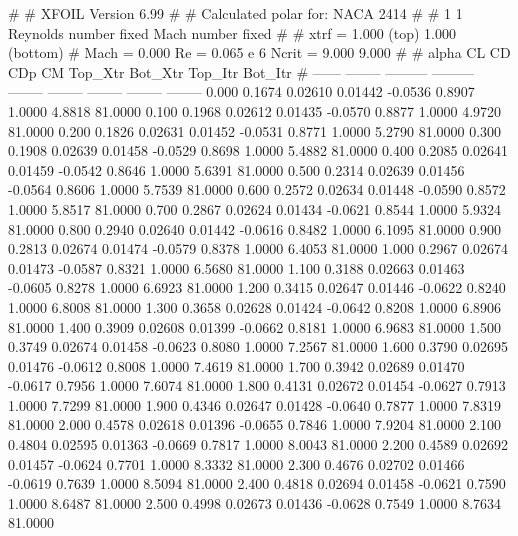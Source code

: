 #  
#       XFOIL         Version 6.99
#  
# Calculated polar for: NACA 2414                                       
#  
# 1 1 Reynolds number fixed          Mach number fixed         
#  
# xtrf =   1.000 (top)        1.000 (bottom)  
# Mach =   0.000     Re =     0.065 e 6     Ncrit =   9.000  9.000
#  
#   alpha    CL        CD       CDp       CM     Top_Xtr  Bot_Xtr  Top_Itr  Bot_Itr
#  ------ -------- --------- --------- -------- -------- -------- -------- --------
   0.000   0.1674   0.02610   0.01442  -0.0536   0.8907   1.0000   4.8818  81.0000
   0.100   0.1968   0.02612   0.01435  -0.0570   0.8877   1.0000   4.9720  81.0000
   0.200   0.1826   0.02631   0.01452  -0.0531   0.8771   1.0000   5.2790  81.0000
   0.300   0.1908   0.02639   0.01458  -0.0529   0.8698   1.0000   5.4882  81.0000
   0.400   0.2085   0.02641   0.01459  -0.0542   0.8646   1.0000   5.6391  81.0000
   0.500   0.2314   0.02639   0.01456  -0.0564   0.8606   1.0000   5.7539  81.0000
   0.600   0.2572   0.02634   0.01448  -0.0590   0.8572   1.0000   5.8517  81.0000
   0.700   0.2867   0.02624   0.01434  -0.0621   0.8544   1.0000   5.9324  81.0000
   0.800   0.2940   0.02640   0.01442  -0.0616   0.8482   1.0000   6.1095  81.0000
   0.900   0.2813   0.02674   0.01474  -0.0579   0.8378   1.0000   6.4053  81.0000
   1.000   0.2967   0.02674   0.01473  -0.0587   0.8321   1.0000   6.5680  81.0000
   1.100   0.3188   0.02663   0.01463  -0.0605   0.8278   1.0000   6.6923  81.0000
   1.200   0.3415   0.02647   0.01446  -0.0622   0.8240   1.0000   6.8008  81.0000
   1.300   0.3658   0.02628   0.01424  -0.0642   0.8208   1.0000   6.8906  81.0000
   1.400   0.3909   0.02608   0.01399  -0.0662   0.8181   1.0000   6.9683  81.0000
   1.500   0.3749   0.02674   0.01458  -0.0623   0.8080   1.0000   7.2567  81.0000
   1.600   0.3790   0.02695   0.01476  -0.0612   0.8008   1.0000   7.4619  81.0000
   1.700   0.3942   0.02689   0.01470  -0.0617   0.7956   1.0000   7.6074  81.0000
   1.800   0.4131   0.02672   0.01454  -0.0627   0.7913   1.0000   7.7299  81.0000
   1.900   0.4346   0.02647   0.01428  -0.0640   0.7877   1.0000   7.8319  81.0000
   2.000   0.4578   0.02618   0.01396  -0.0655   0.7846   1.0000   7.9204  81.0000
   2.100   0.4804   0.02595   0.01363  -0.0669   0.7817   1.0000   8.0043  81.0000
   2.200   0.4589   0.02692   0.01457  -0.0624   0.7701   1.0000   8.3332  81.0000
   2.300   0.4676   0.02702   0.01466  -0.0619   0.7639   1.0000   8.5094  81.0000
   2.400   0.4818   0.02694   0.01458  -0.0621   0.7590   1.0000   8.6487  81.0000
   2.500   0.4998   0.02673   0.01436  -0.0628   0.7549   1.0000   8.7634  81.0000
